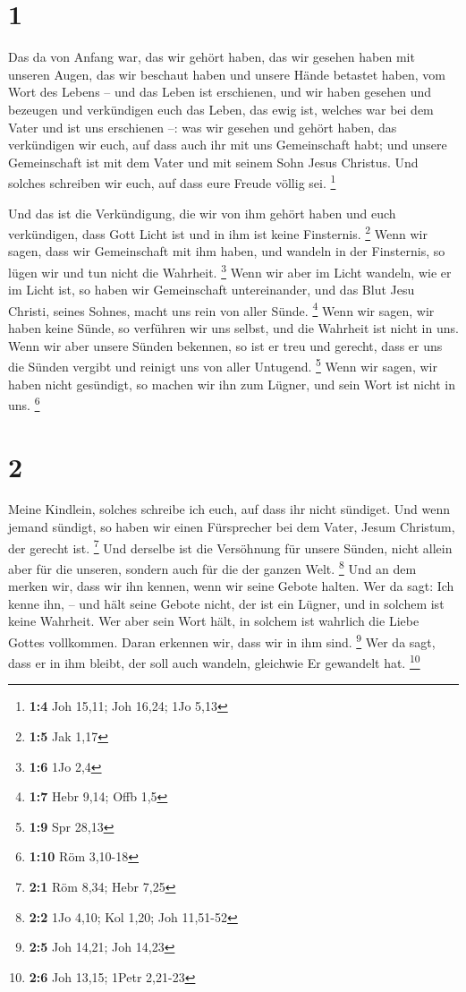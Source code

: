 \hypertarget{section}{%
\section{1}\label{section}}

 Das da von Anfang war, das wir gehört haben, das wir
gesehen haben mit unseren Augen, das wir beschaut haben und unsere Hände
betastet haben, vom Wort des Lebens --  und das Leben ist
erschienen, und wir haben gesehen und bezeugen und verkündigen euch das
Leben, das ewig ist, welches war bei dem Vater und ist uns erschienen
--:  was wir gesehen und gehört haben, das verkündigen wir
euch, auf dass auch ihr mit uns Gemeinschaft habt; und unsere
Gemeinschaft ist mit dem Vater und mit seinem Sohn Jesus Christus.
 Und solches schreiben wir euch, auf dass eure Freude völlig
sei. \footnote{\textbf{1:4} Joh 15,11; Joh 16,24; 1Jo 5,13}

 Und das ist die Verkündigung, die wir von ihm gehört haben
und euch verkündigen, dass Gott Licht ist und in ihm ist keine
Finsternis. \footnote{\textbf{1:5} Jak 1,17}  Wenn wir
sagen, dass wir Gemeinschaft mit ihm haben, und wandeln in der
Finsternis, so lügen wir und tun nicht die Wahrheit. \footnote{\textbf{1:6}
  1Jo 2,4}  Wenn wir aber im Licht wandeln, wie er im Licht
ist, so haben wir Gemeinschaft untereinander, und das Blut Jesu Christi,
seines Sohnes, macht uns rein von aller Sünde. \footnote{\textbf{1:7}
  Hebr 9,14; Offb 1,5}  Wenn wir sagen, wir haben keine
Sünde, so verführen wir uns selbst, und die Wahrheit ist nicht in uns.
 Wenn wir aber unsere Sünden bekennen, so ist er treu und
gerecht, dass er uns die Sünden vergibt und reinigt uns von aller
Untugend. \footnote{\textbf{1:9} Spr 28,13}  Wenn wir
sagen, wir haben nicht gesündigt, so machen wir ihn zum Lügner, und sein
Wort ist nicht in uns. \footnote{\textbf{1:10} Röm 3,10-18}

\hypertarget{section-1}{%
\section{2}\label{section-1}}

 Meine Kindlein, solches schreibe ich euch, auf dass ihr
nicht sündiget. Und wenn jemand sündigt, so haben wir einen Fürsprecher
bei dem Vater, Jesum Christum, der gerecht ist. \footnote{\textbf{2:1}
  Röm 8,34; Hebr 7,25}  Und derselbe ist die Versöhnung für
unsere Sünden, nicht allein aber für die unseren, sondern auch für die
der ganzen Welt. \footnote{\textbf{2:2} 1Jo 4,10; Kol 1,20; Joh 11,51-52}
 Und an dem merken wir, dass wir ihn kennen, wenn wir seine
Gebote halten.  Wer da sagt: Ich kenne ihn, -- und hält
seine Gebote nicht, der ist ein Lügner, und in solchem ist keine
Wahrheit.  Wer aber sein Wort hält, in solchem ist wahrlich
die Liebe Gottes vollkommen. Daran erkennen wir, dass wir in ihm sind.
\footnote{\textbf{2:5} Joh 14,21; Joh 14,23}  Wer da sagt,
dass er in ihm bleibt, der soll auch wandeln, gleichwie Er gewandelt
hat. \footnote{\textbf{2:6} Joh 13,15; 1Petr 2,21-23}

